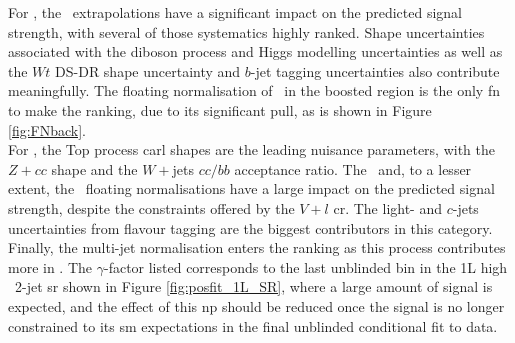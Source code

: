 For \vhb, the \whf\ extrapolations have a significant impact on the predicted signal strength, with several of those systematics highly ranked. Shape uncertainties associated with the diboson process and Higgs modelling uncertainties as well as the $Wt$ DS-DR shape uncertainty and $b$-jet tagging uncertainties also contribute meaningfully. The floating normalisation of \whf\ in the boosted region is the only \gls{fn} to make the ranking, due to its significant pull, as is shown in Figure \ref{fig:FNback}. \\

For \vhc, the Top process \gls{carl} shapes are the leading nuisance parameters, with the $Z+cc$ shape and the $W+$jets $cc/bb$ acceptance ratio. The \zlf\ and, to a lesser extent, the \wlf\ floating normalisations have a large impact on the predicted signal strength, despite the constraints offered by the $V+l$ \gls{cr}. The light- and $c$-jets uncertainties from flavour tagging are the biggest contributors in this category. Finally, the multi-jet normalisation enters the ranking as this process contributes more in \vhc. The $\gamma$-factor listed corresponds to the last unblinded bin in the 1L high \ptv\ 2-jet \gls{sr} shown in Figure \ref{fig:posfit_1L_SR}, where a large amount of signal is expected, and the effect of this \gls{np} should be reduced once the signal is no longer constrained to its \gls{sm} expectations in the final unblinded conditional fit to data.

